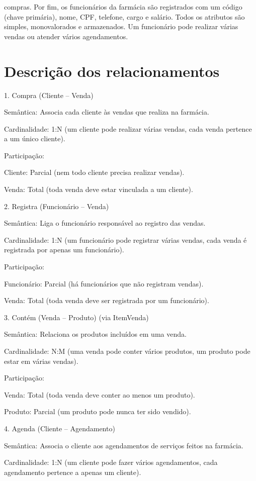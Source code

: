 \documentclass{article}
\begin{document}
compras. Por fim, os funcionários da farmácia são registrados com um código (chave primária), nome, CPF, telefone, cargo e salário. Todos os atributos são simples, monovalorados e armazenados. Um funcionário pode realizar várias vendas ou atender vários agendamentos. 


\newpage

\section{Descrição dos relacionamentos}

1. Compra (Cliente – Venda)

Semântica: Associa cada cliente às vendas que realiza na farmácia.

Cardinalidade: 1:N (um cliente pode realizar várias vendas, cada venda pertence a um único cliente).

Participação:

Cliente: Parcial (nem todo cliente precisa realizar vendas).

Venda: Total (toda venda deve estar vinculada a um cliente).

2. Registra (Funcionário – Venda)

Semântica: Liga o funcionário responsável ao registro das vendas.

Cardinalidade: 1:N (um funcionário pode registrar várias vendas, cada venda é registrada por apenas um funcionário).

Participação:

Funcionário: Parcial (há funcionários que não registram vendas).

Venda: Total (toda venda deve ser registrada por um funcionário).

3. Contém (Venda – Produto) (via ItemVenda)

Semântica: Relaciona os produtos incluídos em uma venda.

Cardinalidade: N:M (uma venda pode conter vários produtos, um produto pode estar em várias vendas).

Participação:

Venda: Total (toda venda deve conter ao menos um produto).

Produto: Parcial (um produto pode nunca ter sido vendido).

4. Agenda (Cliente – Agendamento)

Semântica: Associa o cliente aos agendamentos de serviços feitos na farmácia.

Cardinalidade: 1:N (um cliente pode fazer vários agendamentos, cada agendamento pertence a apenas um cliente).
\end{document}
